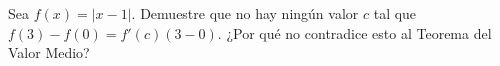 \item Sea $f(x) = |x - 1|$. Demuestre que no hay ningún valor $c$ tal que $f(3) - f(0) = f'(c)(3 - 0)$. ¿Por qué no contradice esto al Teorema del Valor Medio?
